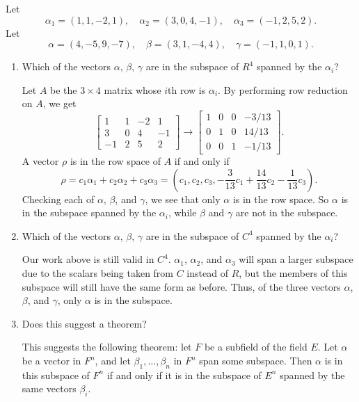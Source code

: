  Let
\begin{equation*}
  \alpha_1 = (1, 1, -2, 1), \quad
  \alpha_2 = (3, 0, 4, -1), \quad
  \alpha_3 = (-1, 2, 5, 2).
\end{equation*}
Let
\begin{equation*}
  \alpha = (4, -5, 9, -7), \quad
  \beta = (3, 1, -4, 4), \quad
  \gamma = (-1, 1, 0, 1).
\end{equation*}
\begin{enumerate}
\item Which of the vectors $\alpha$, $\beta$, $\gamma$ are in the
  subspace of $R^4$ spanned by the $\alpha_i$?
  \begin{solution}
    Let $A$ be the $3\times4$ matrix whose $i$th row is $\alpha_i$. By
    performing row reduction on $A$, we get
    \begin{equation*}
      \begin{bmatrix}
        1 & 1 & -2 & 1 \\
        3 & 0 & 4 & -1 \\
        -1 & 2 & 5 & 2
      \end{bmatrix}
      \rightarrow
      \begin{bmatrix}
        1 & 0 & 0 & -3/13 \\
        0 & 1 & 0 & 14/13 \\
        0 & 0 & 1 & -1/13
      \end{bmatrix}.
    \end{equation*}
    A vector $\rho$ is in the row space of $A$ if and only if
    \begin{equation*}
      \rho = c_1\alpha_1 + c_2\alpha_2 + c_3\alpha_3
      = \left(c_1, c_2, c_3, -\frac{3}{13}c_1
        + \frac{14}{13}c_2 - \frac1{13}c_3\right).
    \end{equation*}
    Checking each of $\alpha$, $\beta$, and $\gamma$, we see that only
    $\alpha$ is in the row space. So $\alpha$ is in the subspace
    spanned by the $\alpha_i$, while $\beta$ and $\gamma$ are not in
    the subspace.
  \end{solution}
\item Which of the vectors $\alpha$, $\beta$, $\gamma$ are in the
  subspace of $C^4$ spanned by the $\alpha_i$?
  \begin{solution}
    Our work above is still valid in $C^4$. $\alpha_1$, $\alpha_2$,
    and $\alpha_3$ will span a larger subspace due to the scalars
    being taken from $C$ instead of $R$, but the members of this
    subspace will still have the same form as before. Thus, of the
    three vectors $\alpha$, $\beta$, and $\gamma$, only $\alpha$ is in
    the subspace.
  \end{solution}
\item Does this suggest a theorem?
  \begin{solution}
    This suggests the following theorem: let $F$ be a subfield of the
    field $E$. Let $\alpha$ be a vector in $F^n$, and let
    $\beta_1,\dots,\beta_n$ in $F^n$ span some subspace. Then $\alpha$
    is in this subspace of $F^n$ if and only if it is in the subspace
    of $E^n$ spanned by the same vectors $\beta_i$.
  \end{solution}
\end{enumerate}

